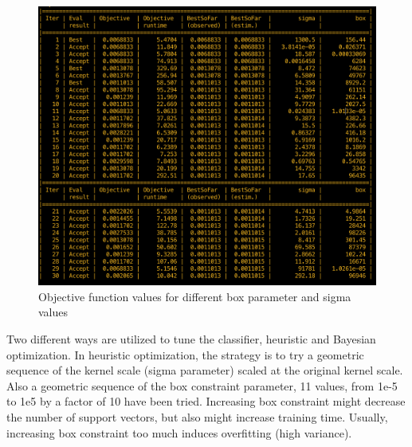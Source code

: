 \begin{figure}
\begin{center}
\includegraphics[width=1.13\textwidth]{figures/optimizationSummaryStuckFault}    %
\caption{Objective function values for different box parameter and sigma values} 
\label{fig:objFuncModel}
\end{center}
\end{figure}

Two different ways are utilized to tune the classifier, heuristic and Bayesian optimization. In heuristic optimization, the strategy is to try a geometric sequence of the kernel scale (sigma parameter) scaled at the original kernel scale.  Also a geometric sequence of the box constraint parameter, 11 values, from 1e-5 to 1e5 by a factor of 10 have been tried. Increasing box constraint might decrease the number of support vectors, but also might increase training time. Usually, increasing box constraint too much induces overfitting (high variance). 

